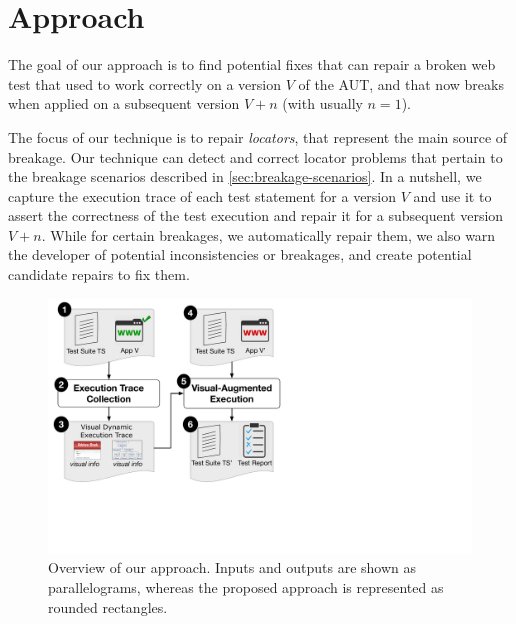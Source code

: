 \section{Approach}\label{sec:approach}

The goal of our approach is to find potential fixes that can repair a broken web test that used to work correctly on a version $V$ of the AUT, and that now breaks when applied on a subsequent version $V+n$ (with usually $n=1$).

The focus of our technique is to repair \textit{locators}, that represent the main source of breakage.
Our technique can detect and correct locator problems that pertain to the breakage scenarios described in \autoref{sec:breakage-scenarios}.
In a nutshell, we capture the execution trace of each test statement for a version $V$ and use it to assert the correctness of the test execution and repair it for a subsequent version $V+n$. While for certain breakages, we automatically repair them, we also warn the developer of potential inconsistencies or breakages, and create potential candidate repairs to fix them. 

\begin{figure}[t]
\centering
\includegraphics[trim={0.2cm 6.5cm 17cm 0.2cm},clip,scale=0.28]{images/approach-bigger}
\caption{Overview of our approach. Inputs and outputs are shown as parallelograms, whereas the proposed approach is represented as rounded rectangles.}
\label{approach}
\end{figure}

